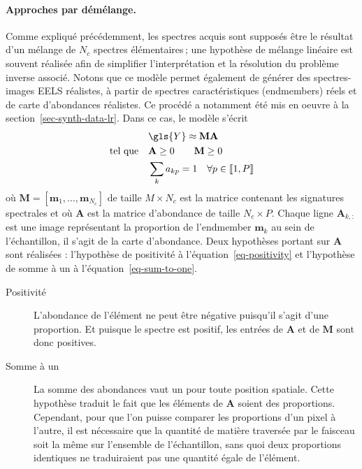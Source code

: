     \paragraph{Approches par démélange.} Comme expliqué précédemment, les spectres acquis sont supposés être le résultat d'un mélange de $N_c$ spectres élémentaires\,; une hypothèse de mélange linéaire est souvent réalisée afin de simplifier l'interprétation et la résolution du problème inverse associé. %
    Notons que ce modèle permet également de générer des spectres-images EELS réalistes, à partir de spectres caractéristiques (endmembers) réels et de carte d'abondances réalistes. Ce procédé a notamment été mis en oeuvre à la section~\ref{sec-synth-data-lr}.
    Dans ce cas, le modèle s'écrit~\cite{dobigeon2016linear}
    \begin{align}
    &\gls{Y} \approx \mathbf{M}\mathbf{A}\\
    \text{tel que}\quad &\mathbf{A} \geq 0\qquad \mathbf{M} \geq 0\label{eq-positivity}\\
    &\sum_k a_{kp} = 1 \quad \forall p\in\llbracket 1 , P \rrbracket \label{eq-sum-to-one}
    \end{align}
    où $\mathbf{M}=[\mathbf{m}_1,\dots,\mathbf{m}_{N_c}]$ de taille $M\times N_c$ est la matrice contenant les signatures spectrales et où $\mathbf{A}$ est la matrice d'abondance de taille $N_c\times P$. Chaque ligne $\mathbf{A}_{k,:}$ est une image représentant la proportion de l'endmember $\mathbf{m}_k$ au sein de l'échantillon, il s'agit de la carte d'abondance. Deux hypothèses portant sur $\mathbf{A}$ sont réalisées : l'hypothèse de positivité à l'équation~\eqref{eq-positivity} et l'hypothèse de somme à un à l'équation~\eqref{eq-sum-to-one}.
    \begin{description}
        \item[Positivité] L'abondance de l'élément ne peut être négative puisqu'il s'agit d'une proportion. Et puisque le spectre est positif, les entrées de $\mathbf{A}$ et de $\mathbf{M}$ sont donc positives.
        \item[Somme à un] La somme des abondances vaut un pour toute position spatiale. Cette hypothèse traduit le fait que les éléments de $\mathbf{A}$ soient des proportions. Cependant, pour que l'on puisse comparer les proportions d'un pixel à l'autre, il est nécessaire que la quantité de matière traversée par le faisceau soit la même sur l'ensemble de l'échantillon, sans quoi deux proportions identiques ne traduiraient pas une quantité égale de l'élément.
    \end{description}
